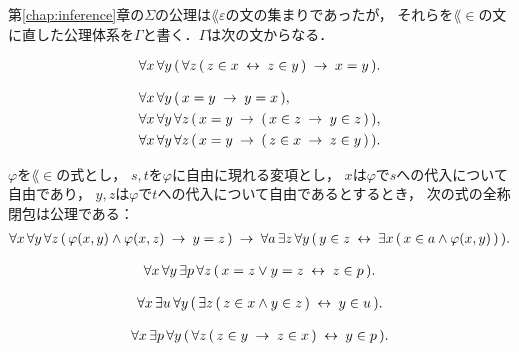 	第\ref{chap:inference}章の$\Sigma$の公理は$\lang{\varepsilon}$の文の集まりであったが，
	それらを$\lang{\in}$の文に直した公理体系を$\Gamma$と書く．$\Gamma$は次の文からなる．
	\begin{description}
	\label{axioms_of_Gamma}
		\item[外延性]
			\begin{align}
				\forall x\, \forall y\, (\, \forall z\, 
				(\, z \in x \hspace{0.25em}\leftrightarrow\hspace{0.25em} z \in y\, ) \hspace{0.25em}\rightarrow\hspace{0.25em} x = y\, ).
			\end{align}
			
		\item[相等性] 
			\begin{align}
				&\forall x\, \forall y\, (\, x = y \hspace{0.25em}\rightarrow\hspace{0.25em} y = x\, ), \\
				&\forall x\, \forall y\, \forall z\, 
				(\, x = y \hspace{0.25em}\rightarrow\hspace{0.25em} (\, x \in z \hspace{0.25em}\rightarrow\hspace{0.25em} y \in z\, )\, ), \\
				&\forall x\, \forall y\, \forall z\, 
				(\, x = y \hspace{0.25em}\rightarrow\hspace{0.25em} (\, z \in x \hspace{0.25em}\rightarrow\hspace{0.25em} z \in y\, )\, ).
			\end{align}
		
		\item[置換] $\varphi$を$\lang{\in}$の式とし，
			$s,t$を$\varphi$に自由に現れる変項とし，
			$x$は$\varphi$で$s$への代入について自由であり，
			$y,z$は$\varphi$で$t$への代入について自由であるとするとき，
			次の式の全称閉包\footnotemark は公理である：
			\begin{align}
				\forall x\, \forall y\, \forall z\, 
				(\, \varphi(x,y) \wedge \varphi(x,z)
				\hspace{0.25em}\rightarrow\hspace{0.25em} y = z\, )
				\hspace{0.25em}\rightarrow\hspace{0.25em} \forall a\, \exists z\, \forall y\,
				(\, y \in z \hspace{0.25em}\leftrightarrow\hspace{0.25em} \exists x\, (\, x \in a \wedge 
				\varphi(x,y)\, )\, ).
			\end{align}
			
		\item[対] 
			\begin{align}
				\forall x\, \forall y\, \exists p\, \forall z\, 
				(\, x = z \vee y = z \hspace{0.25em}\leftrightarrow\hspace{0.25em} z \in p\, ).
			\end{align}
			
		\item[合併] 
			\begin{align}
				\forall x\, \exists u\, \forall y\, (\, \exists z\, (\, z \in x \wedge y \in z\, ) \hspace{0.25em}\leftrightarrow\hspace{0.25em} y \in u\, ).
			\end{align}
			
		\item[冪] 
			\begin{align}
				\forall x\, \exists p\, \forall y\, 
				(\, \forall z\, (\, z \in y \hspace{0.25em}\rightarrow\hspace{0.25em} z \in x\, ) \hspace{0.25em}\leftrightarrow\hspace{0.25em} y \in p\, ).
			\end{align}
			

\end{description}
